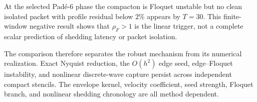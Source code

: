 At the selected Pad\'e-6 phase the compacton is Floquet unstable but no clean
isolated packet with profile residual below $2\%$ appears by $T=30$.  This
finite-window negative result shows that $\rho_F>1$ is the linear trigger, not
a complete scalar prediction of shedding latency or packet isolation.

The comparison therefore separates the robust mechanism from its numerical
realization.  Exact Nyquist reduction, the $O(h^2)$ edge seed, edge--Floquet
instability, and nonlinear discrete-wave capture persist across independent
compact stencils.  The envelope kernel, velocity coefficient, seed strength,
Floquet branch, and nonlinear shedding chronology are all method dependent.
